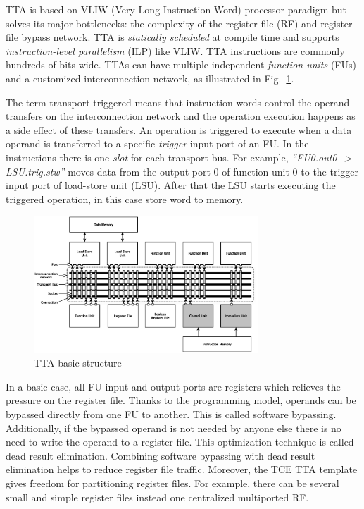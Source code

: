 \documentclass[twoside]{tceusermanual}
\begin{document}
TTA is based on VLIW (Very Long Instruction Word) processor paradigm
but solves its major bottlenecks: the complexity of the register file (RF)
and register file bypass network. TTA is \textit{statically
scheduled} at compile time and supports \textit{instruction-level
parallelism} (ILP) like VLIW. TTA instructions are commonly hundreds of
bits wide. TTAs can have multiple independent \textit{function units} (FUs) and
a customized interconnection network, as illustrated in Fig.~\ref{fig:tta1}.

The term transport-triggered means that instruction words control the
operand transfers on the interconnection network and the operation
execution happens as a side effect of these transfers. An operation is
triggered to execute when a data operand is transferred to a specific
\textit{trigger} input port of an FU. In the instructions there is one
\textit{slot} for each transport bus. For example, \textit{``FU0.out0
  -> LSU.trig.stw''} moves data from the output port $0$ of function
unit $0$ to the trigger input port of load-store unit (LSU). After
that the LSU starts executing the triggered operation, in this case
store word to memory. 


\begin{figure}
  \begin{center} 
  \includegraphics[width=0.75\textwidth]{eps/tta}
	\caption{TTA basic structure} 
	\label{fig:tta1} 
  \end{center}
\end{figure}

In a basic case, all FU input and output ports are registers which
relieves the pressure on the register file. Thanks to the programming
model, operands can be bypassed directly from one FU to another. This
is called software bypassing. Additionally, if the bypassed operand is
not needed by anyone else there is no need to write the operand to a
register file. This optimization technique is called dead result
elimination. Combining software bypassing with dead result elimination
helps to reduce register file traffic.  Moreover, the TCE TTA template
gives freedom for partitioning register files. For example, there can
be several small and simple register files instead one centralized
multiported RF.
\end{document}
